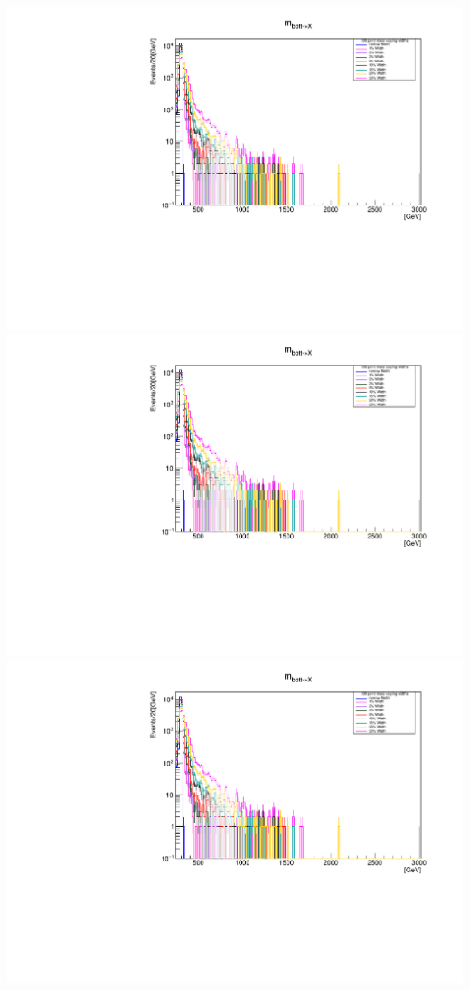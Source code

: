\documentclass[a4wide,10pt]{article}
\begin{document}
\includegraphics[scale=0.50,page=4]{../Pdfs/bb+tt->X_Mass_VaryingWidths.pdf}
\includegraphics[scale=0.50,page=5]{../Pdfs/bb+tt->X_Mass_VaryingWidths.pdf}
\includegraphics[scale=0.50,page=6]{../Pdfs/bb+tt->X_Mass_VaryingWidths.pdf}
\end{document}
